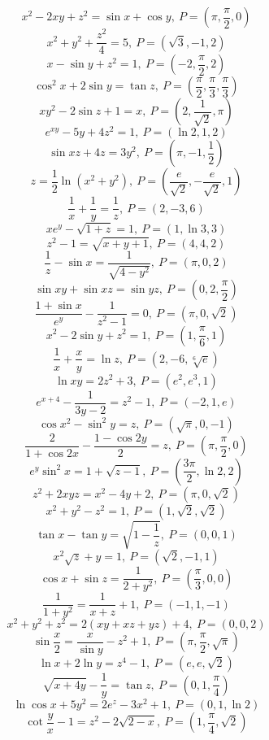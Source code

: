 \[ x^2 - 2xy + z^2 = \sin{x} + \cos{y}, ~ P = \left( \pi, \frac{\pi}{2}, 0 \right) \]
\[ x^2 + y^2 + \frac{z^2}{4} = 5, ~ P = \left( \sqrt{3}, -1, 2 \right) \]
\[ x - \sin{y} + z^2 = 1, ~ P = \left( -2, \frac{\pi}{2}, 2 \right) \]
\[ \cos^2{x} + 2\sin{y} = \tan{z}, ~ P = \left( \frac{\pi}{2}, \frac{\pi}{3}, \frac{\pi}{3} \right) \]
\[ xy^2 - 2\sin{z} + 1 = x, ~ P = \left( 2, \frac{1}{\sqrt{2}}, \pi \right) \]
\[ e^{xy} - 5y + 4z^2 = 1, ~ P = \left( \ln{2}, 1, 2 \right) \]
\[ \sin{xz} + 4z = 3y^2, ~ P = \left( \pi, -1, \frac{1}{2} \right) \]
\[ z = \frac{1}{2} \ln{(x^2+y^2)}, ~ P = \left( \frac{e}{\sqrt{2}}, -\frac{e}{\sqrt{2}} , 1 \right) \]
\[ \frac{1}{x} + \frac{1}{y} = \frac{1}{z}, ~ P = \left( 2, -3, 6 \right) \]
\[ xe^y - \sqrt{1+z} = 1, ~ P = \left( 1, \ln{3}, 3 \right) \]
\[ z^2 - 1 = \sqrt{x+y+1}, ~ P = \left( 4, 4, 2 \right) \]
\[ \frac{1}{z} - \sin{x} = \frac{1}{\sqrt{4-y^2}}, ~ P = \left( \pi, 0, 2 \right) \]
\[ \sin{xy} + \sin{xz} = \sin{yz}, ~ P = \left( 0, 2, \frac{\pi}{2} \right) \]
\[ \frac{1 + \sin{x}}{e^y} - \frac{1}{z^2 - 1} = 0, ~ P = \left( \pi, 0, \sqrt{2} \right) \]
\[ x^2 - 2\sin{y} + z^2 = 1, ~ P = \left( 1, \frac{\pi}{6}, 1 \right) \]
\[ \frac{1}{x} + \frac{x}{y} = \ln{z}, ~ P = \left( 2, -6, \sqrt[6]{e} \right) \]
\[ \ln{xy} = 2z^2 + 3, ~ P = \left( e^2, e^3, 1 \right) \]
\[ e^{x + 4} - \frac{1}{3y-2} = z^2 - 1, ~ P = \left( -2, 1, e \right) \]
\[ \cos{x^2} - \sin^2{y} = z, ~ P = \left( \sqrt{\pi}, 0, -1 \right) \]
\[ \frac{2}{1 + \cos{2x}} - \frac{1 - \cos{2y}}{2} = z, ~ P = \left( \pi, \frac{\pi}{2}, 0 \right) \]
\[ e^y \sin^2{x} = 1 + \sqrt{z-1}, ~ P = \left( \frac{3\pi}{2}, \ln{2}, 2 \right) \]
\[ z^2 + 2xyz = x^2 - 4y + 2, ~ P = \left( \pi, 0, \sqrt{2} \right) \]
\[ x^2 + y^2 - z^2 = 1, ~ P = \left( 1, \sqrt{2}, \sqrt{2} \right) \]
\[ \tan{x} - \tan{y} = \sqrt{1 - \frac{1}{z}}, ~ P = \left( 0, 0, 1 \right) \]
\[ x^2 \sqrt{z} + y = 1, ~ P = \left( \sqrt{2}, -1, 1 \right) \]
\[ \cos{x} + \sin{z} = \frac{1}{2 + y^2}, ~ P = \left( \frac{\pi}{3}, 0, 0 \right) \]
\[ \frac{1}{1+y^2} = \frac{1}{x+z} + 1, ~ P = \left( -1, 1, -1 \right) \]
\[ x^2 + y^2 + z^2 = 2(xy + xz + yz) + 4, ~ P = \left( 0, 0, 2 \right) \]
\[ \sin{\frac{x}{2}} = \frac{x}{\sin{y}} - z^2 + 1, ~ P = \left( \pi, \frac{\pi}{2}, \sqrt{\pi} \right) \]
\[ \ln{x} + 2\ln{y} = z^4 - 1, ~ P = \left( e, e, \sqrt{2} \right) \]
\[ \sqrt{x+4y} - \frac{1}{y} = \tan{z}, ~ P = \left( 0, 1, \frac{\pi}{4} \right) \]
\[ \ln{\cos{x}} + 5y^2 = 2e^z - 3x^2 + 1, ~ P = \left( 0, 1, \ln{2} \right) \]
\[ \cot{\frac{y}{x}} - 1 = z^2 - 2\sqrt{2 - x}, ~ P = \left( 1, \frac{\pi}{4}, \sqrt{2} \right) \]
